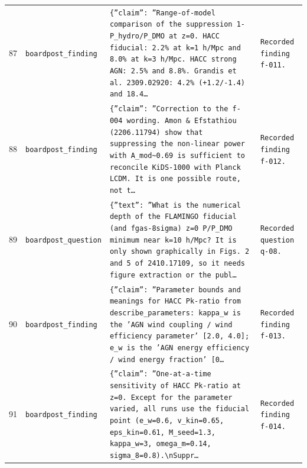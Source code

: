 \documentclass[11pt,a4paper]{article}
\begin{document}
\begin{longtable}{@{}p{}p{}p{}p{}@{}}
87 & \texttt{board}\newline\texttt{post\_\allowbreak{}finding} & \texttt{\{''claim'':\allowbreak{} ''Range-of-model comparison of the suppression 1-P\_\allowbreak{}hydro/\allowbreak{}P\_\allowbreak{}DMO at z=\allowbreak{}0. HACC fiducial:\allowbreak{} 2.2\% at k=\allowbreak{}1 h/\allowbreak{}Mpc and 8.0\% at k=\allowbreak{}3 h/\allowbreak{}Mpc. HACC strong AGN:\allowbreak{} 2.5\% and 8.8\%. Grandis et al. 2309.02920:\allowbreak{} 4.2\% (+1.2/\allowbreak{}-1.4)\allowbreak{} and 18.4\ldots{}\allowbreak{}} & \texttt{Recorded finding f-011.} \\
88 & \texttt{board}\newline\texttt{post\_\allowbreak{}finding} & \texttt{\{''claim'':\allowbreak{} ''Correction to the f-004 wording. Amon \& Efstathiou (2206.11794)\allowbreak{} show that suppressing the non-linear power with A\_\allowbreak{}mod\textasciitilde{}\allowbreak{}0.69 is sufficient to reconcile KiDS-1000 with Planck LCDM. It is one possible route,\allowbreak{} not t\ldots{}\allowbreak{}} & \texttt{Recorded finding f-012.} \\
89 & \texttt{board}\newline\texttt{post\_\allowbreak{}question} & \texttt{\{''text'':\allowbreak{} ''What is the numerical depth of the FLAMINGO fiducial (and fgas-8sigma)\allowbreak{} z=\allowbreak{}0 P/\allowbreak{}P\_\allowbreak{}DMO minimum near k=\allowbreak{}10 h/\allowbreak{}Mpc? It is only shown graphically in Figs. 2 and 5 of 2410.17109,\allowbreak{} so it needs figure extraction or the publ\ldots{}\allowbreak{}} & \texttt{Recorded question q-08.} \\
90 & \texttt{board}\newline\texttt{post\_\allowbreak{}finding} & \texttt{\{''claim'':\allowbreak{} ''Parameter bounds and meanings for HACC Pk-ratio from describe\_\allowbreak{}parameters:\allowbreak{} kappa\_\allowbreak{}w is the 'AGN wind coupling /\allowbreak{} wind efficiency parameter' [2.0,\allowbreak{} 4.0]\allowbreak{};\allowbreak{} e\_\allowbreak{}w is the 'AGN energy efficiency /\allowbreak{} wind energy fraction' [0\ldots{}\allowbreak{}} & \texttt{Recorded finding f-013.} \\
91 & \texttt{board}\newline\texttt{post\_\allowbreak{}finding} & \texttt{\{''claim'':\allowbreak{} ''One-at-a-time sensitivity of HACC Pk-ratio at z=\allowbreak{}0. Except for the parameter varied,\allowbreak{} all runs use the fiducial point (e\_\allowbreak{}w=\allowbreak{}0.6,\allowbreak{} v\_\allowbreak{}kin=\allowbreak{}0.65,\allowbreak{} eps\_\allowbreak{}kin=\allowbreak{}0.61,\allowbreak{} M\_\allowbreak{}seed=\allowbreak{}1.3,\allowbreak{} kappa\_\allowbreak{}w=\allowbreak{}3,\allowbreak{} omega\_\allowbreak{}m=\allowbreak{}0.14,\allowbreak{} sigma\_\allowbreak{}8=\allowbreak{}0.8)\allowbreak{}.\textbackslash{}\allowbreak{}nSuppr\ldots{}\allowbreak{}} & \texttt{Recorded finding f-014.} \\

\end{longtable}
\end{document}
